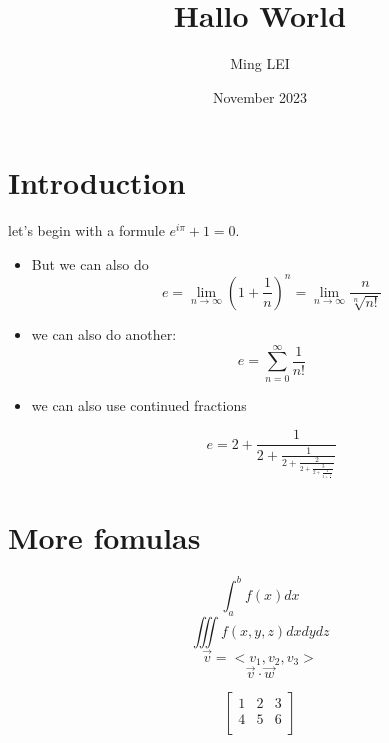 \documentclass{article}
\title{Hallo World}
\author{Ming LEI}
\date{November 2023}
\begin{document}
\maketitle

\section*{Introduction}
let's begin with a formule $e^{i\pi}+1=0$.
\begin{itemize}
    \item 

But we can also do
$$
e=\lim_{n\to\infty}\left(1+\frac{1}{n}\right)^n = 
\lim_{n\to\infty}\frac{n}{\sqrt[n]{n!}}
$$
\item we can also do another:
$$
e=\sum_{n=0}^{\infty} \frac{1}{n!}
$$

\item we can also use continued fractions

$$
e=2+\frac{1}{2+\frac{1}{2+\frac{2}{2+\frac{3}{2+\frac{4}{2+\frac{5}{\ddots}}}}}}
$$
\end{itemize}

\section*{More fomulas}
$$\int_a^bf(x)dx$$
$$\iiint f(x,y,z)dxdydz$$
$$\Vec{v}=<v_1,v_2,v_3>$$
$$\vec{v}\cdot \vec{w}$$

$$
\begin{bmatrix}
    1&2&3\\
    4&5&6\\
\end{bmatrix}
$$
\end{document}
